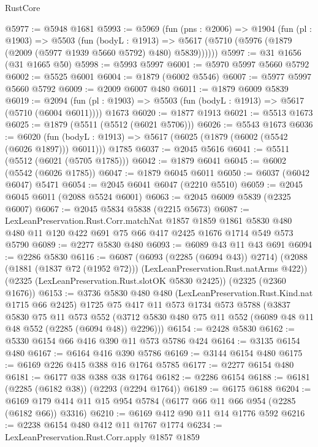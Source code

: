 \begin{lexlean}{RustCore}
\begin{coremodule}
@5977 := @5948 @1681
@5993 := @5969
    (fun (pns : @2006) =>
    @1904
      (fun (pl : @1903) =>
      @5503
        (fun (bodyL : @1913) =>
        @5617 (@5710 (@5976 (@1879 (@2009 (@5977 @1939 @5660 @5792) @480) @5839))))))
@5997 := @31 @1656 (@31 @1665 @50)
@5998 := @5993 @5997
@6001 := @5970 @5997 @5660 @5792
@6002 := @5525 @6001
@6004 := @1879 (@6002 @5546)
@6007 := @5977 @5997 @5660 @5792
@6009 := @2009 @6007 @480
@6011 := @1879 @6009 @5839
@6019 := @2094
    (fun (pl : @1903) => @5503 (fun (bodyL : @1913) => @5617 (@5710 (@6004 @6011))))
    @1673
@6020 := @1877 @1913
@6021 := @5513 @1673
@6025 := @1879 (@5511 (@5512 (@6021 @5706)))
@6026 := @5543 @1673
@6036 := @6020
    (fun (bodyL : @1913) => @5617 (@6025 (@1879 (@6002 (@5542 (@6026 @1897))) @6011)))
    @1785
@6037 := @2045 @5616
@6041 := @5511 (@5512 (@6021 (@5705 @1785)))
@6042 := @1879 @6041
@6045 := @6002 (@5542 (@6026 @1785))
@6047 := @1879 @6045 @6011
@6050 := @6037 (@6042 @6047) @5471
@6054 := @2045 @6041 @6047 (@2210 @5510)
@6059 := @2045 @6045 @6011 (@2088 @5524 @6001)
@6063 := @2045 @6009 @5839 (@2325 @6007)
@6067 := @2045 @5834 @5838 (@2215 @5673)
@6087 := LexLeanPreservation.Rust.Corr.matchNat
    @1857
    @1859
    @1861
    @5830
    @480
    @480
    @11
    @120
    @422
    @691
    @75
    @66
    @417
    @2425
    @1676
    @1714
    @549
    @573
    @5790
@6089 := @2277 @5830 @480
@6093 := @6089 @43 @11 @43 @691
@6094 := @2286 @5830
@6116 := @6087
    (@6093 (@2285 (@6094 @43)) @2714)
    (@2088 (@1881 (@1837 @72 (@1952 @72))) (LexLeanPreservation.Rust.natArms @422))
    (@2325 (LexLeanPreservation.Rust.slotOK @5830 @2425))
    (@2325 (@2360 @1676))
@6153 := @3736
    @5830
    @480
    @480
    (LexLeanPreservation.Rust.Kind.nat @1715 @66 @2425)
    @1725
    @75
    @417
    @11
    @573
    @1734
    @573
    @5788
    (@3837
      @5830
      @75
      @11
      @573
      @552
      (@3712 @5830 @480 @75 @11 @552 (@6089 @48 @11 @48 @552 (@2285 (@6094 @48)) @2296)))
@6154 := @2428 @5830
@6162 := @5330 @6154 @66 @416 @390 @11 @573 @5786 @424
@6164 := @3135 @6154 @480
@6167 := @6164 @416 @390 @5786
@6169 := @3144 @6154 @480
@6175 := @6169 @226 @415 @388 @16 @1764 @5785
@6177 := @2277 @6154 @480
@6181 := @6177 @38 @388 @38 @1764
@6182 := @2286 @6154
@6188 := @6181 (@2285 (@6182 @38)) (@2293 (@2294 @1764))
@6189 := @6175 @6188
@6204 := @6169 @179 @414 @11 @15 @954 @5784 (@6177 @66 @11 @66 @954 (@2285 (@6182 @66)) @3316)
@6210 := @6169 @412 @90 @11 @14 @1776 @592
@6216 := @2238 @6154 @480 @412 @11 @1767 @1774
@6234 := LexLeanPreservation.Rust.Corr.apply
    @1857
    @1859

\end{coremodule}
\end{lexlean}
